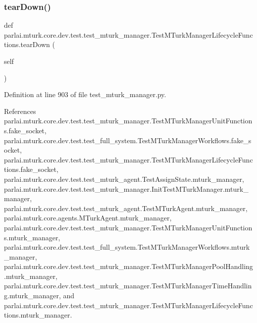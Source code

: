 \subsubsection{\texorpdfstring{tear\+Down()}{tearDown()}}
{\footnotesize\ttfamily def parlai.\+mturk.\+core.\+dev.\+test.\+test\+\_\+mturk\+\_\+manager.\+Test\+M\+Turk\+Manager\+Lifecycle\+Functions.\+tear\+Down (\begin{DoxyParamCaption}\item[{}]{self }\end{DoxyParamCaption})}



Definition at line 903 of file test\+\_\+mturk\+\_\+manager.\+py.



References parlai.\+mturk.\+core.\+dev.\+test.\+test\+\_\+mturk\+\_\+manager.\+Test\+M\+Turk\+Manager\+Unit\+Functions.\+fake\+\_\+socket, parlai.\+mturk.\+core.\+dev.\+test.\+test\+\_\+full\+\_\+system.\+Test\+M\+Turk\+Manager\+Workflows.\+fake\+\_\+socket, parlai.\+mturk.\+core.\+dev.\+test.\+test\+\_\+mturk\+\_\+manager.\+Test\+M\+Turk\+Manager\+Lifecycle\+Functions.\+fake\+\_\+socket, parlai.\+mturk.\+core.\+dev.\+test.\+test\+\_\+mturk\+\_\+agent.\+Test\+Assign\+State.\+mturk\+\_\+manager, parlai.\+mturk.\+core.\+dev.\+test.\+test\+\_\+mturk\+\_\+manager.\+Init\+Test\+M\+Turk\+Manager.\+mturk\+\_\+manager, parlai.\+mturk.\+core.\+dev.\+test.\+test\+\_\+mturk\+\_\+agent.\+Test\+M\+Turk\+Agent.\+mturk\+\_\+manager, parlai.\+mturk.\+core.\+agents.\+M\+Turk\+Agent.\+mturk\+\_\+manager, parlai.\+mturk.\+core.\+dev.\+test.\+test\+\_\+mturk\+\_\+manager.\+Test\+M\+Turk\+Manager\+Unit\+Functions.\+mturk\+\_\+manager, parlai.\+mturk.\+core.\+dev.\+test.\+test\+\_\+full\+\_\+system.\+Test\+M\+Turk\+Manager\+Workflows.\+mturk\+\_\+manager, parlai.\+mturk.\+core.\+dev.\+test.\+test\+\_\+mturk\+\_\+manager.\+Test\+M\+Turk\+Manager\+Pool\+Handling.\+mturk\+\_\+manager, parlai.\+mturk.\+core.\+dev.\+test.\+test\+\_\+mturk\+\_\+manager.\+Test\+M\+Turk\+Manager\+Time\+Handling.\+mturk\+\_\+manager, and parlai.\+mturk.\+core.\+dev.\+test.\+test\+\_\+mturk\+\_\+manager.\+Test\+M\+Turk\+Manager\+Lifecycle\+Functions.\+mturk\+\_\+manager.

\mbox{\label{classparlai_1_1mturk_1_1core_1_1dev_1_1test_1_1test__mturk__manager_1_1TestMTurkManagerLifecycleFunctions_a33dbbefd45dab90f29727329657e7767}} 
